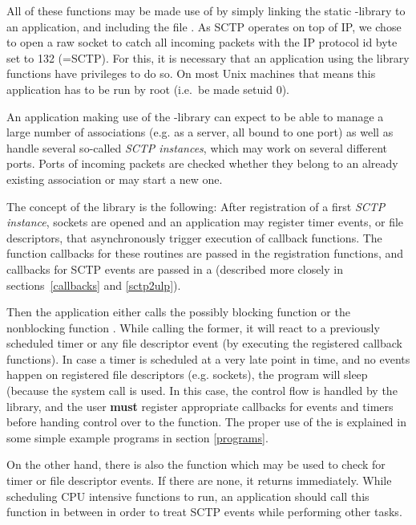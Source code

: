 \documentclass[10pt]{article}
\newcommand{\p}{\medskip \noindent }
\newcommand{\lib}{ \libname{libsctp}-library }
\begin{document}
\p
All of these functions may be made use of by simply linking the static
-library to an application, and including the file .
As SCTP operates on top of IP, we chose to open a raw socket to catch all
incoming packets with the IP protocol id byte set to 132 (=SCTP). For this,
it is necessary that an application using the library functions
have privileges to do so. On most Unix machines that means this application
has to be run by root (i.e.\ be made setuid 0).

\p
An application making use of the \lib can expect to
be able to manage a large number of associations (e.g. as a server, all bound to
one port) as well as handle several so-called \emph{SCTP instances}, which may work
on several different ports. Ports of incoming packets are checked whether they
belong to an already existing association or may start a new one.

\p
The concept of the library is the following: After registration of a first
\emph{SCTP instance}, sockets are opened and an application may register timer
events, or file descriptors, that asynchronously trigger execution of  callback
functions. The function callbacks for these routines are passed in the
registration functions, and callbacks for SCTP  events are passed in
a  (described more closely in
sections~\ref{callbacks} and \ref{sctp2ulp}).

Then the application either calls the possibly blocking function 
 or the nonblocking function .
While calling the former, it will react to a previously scheduled timer or any
file descriptor event (by executing the registered callback functions).
In case a timer is scheduled at a very late point in time, and no events
happen on registered file descriptors (e.g. sockets), the program will
sleep (because the system call  is used.
In this case, the control flow is handled by the library, and the user 
{\bf must} register appropriate callbacks for events and timers before handing 
control over to the   function.
The proper use of the  is explained in some simple
example programs in section \ref{programs}.

On the other hand, there is also the function  
which may be used to check for timer or file descriptor events. If there
are none, it returns immediately. While scheduling CPU intensive functions
to run, an application should call this function in between in order
to treat SCTP events while performing other tasks.
\end{document}
